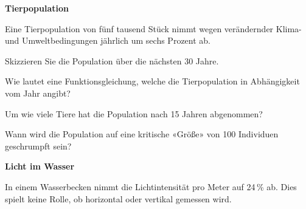 

\bbwActAufgabenNr{} \textbf{Tierpopulation}

Eine Tierpopulation von fünf tausend Stück nimmt wegen verändernder Klima-
und Umweltbedingungen jährlich um sechs Prozent ab.


\begin{bbwAufgabenBlock}

\item Skizzieren Sie die Population über die nächsten 30 Jahre.
\item Wie lautet eine Funktionsgleichung, welche die Tierpopulation in
  Abhängigkeit vom Jahr angibt?
\item Um wie viele Tiere hat die Population nach 15 Jahren abgenommen?


  

\item Wann wird die Population auf eine kritische «Größe» von 100
  Individuen geschrumpft sein?
\end{bbwAufgabenBlock}
\platzFuerBerechnungenBisEndeSeite{}



\bbwActAufgabenNr{} \textbf{Licht im Wasser}

In einem Wasserbecken nimmt die Lichtintensität pro Meter auf 24\,\% ab.
Dies spielt keine Rolle, ob horizontal oder vertikal gemessen wird.


